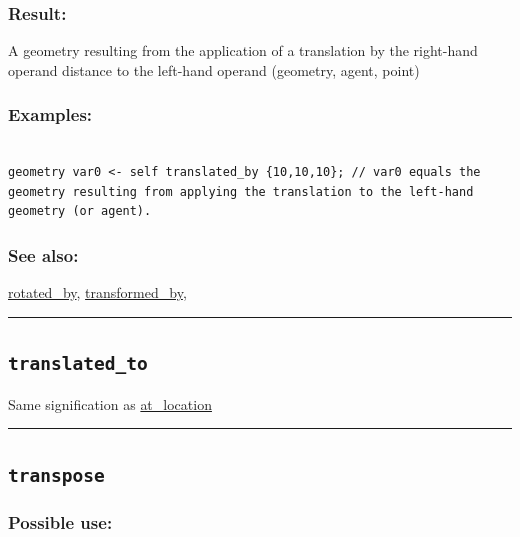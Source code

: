 \documentclass[]{book}
\theoremstyle{definition}
\theoremstyle{definition}
\theoremstyle{definition}
\theoremstyle{remark}
\begin{document}
\subsubsection{Result:}\label{result-513}

A geometry resulting from the application of a translation by the
right-hand operand distance to the left-hand operand (geometry, agent,
point)

\subsubsection{Examples:}\label{examples-368}

\begin{verbatim}
 
geometry var0 <- self translated_by {10,10,10}; // var0 equals the geometry resulting from applying the translation to the left-hand geometry (or agent).
\end{verbatim}

\subsubsection{See also:}\label{see-also-210}

\href{operators-n-to-r.html\#rotated_by}{rotated\_by},
\href{operators-s-to-z.html\#transformed_by}{transformed\_by},

\begin{center}\rule{0.5\linewidth}{\linethickness}\end{center}

\subsection{\texorpdfstring{\texttt{translated\_to}}{translated\_to}}\label{translated_to}

Same signification as
\href{operators-a-to-a.html\#at_location}{at\_location}

\begin{center}\rule{0.5\linewidth}{\linethickness}\end{center}

\subsection{\texorpdfstring{\texttt{transpose}}{transpose}}\label{transpose}

\subsubsection{Possible use:}\label{possible-use-532}
\end{document}
